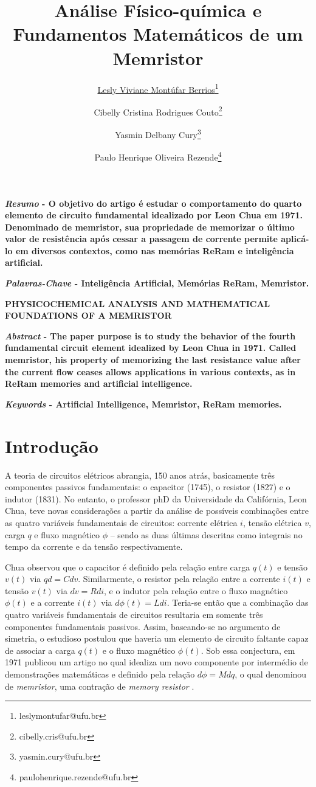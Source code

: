 \documentclass{ceel}
\title{Análise Físico-química e Fundamentos Matemáticos de um Memristor}
\author[1]{\underline{Lesly Viviane Montúfar Berrios}\thanks{leslymontufar@ufu.br}}
\author[1]{Cibelly Cristina Rodrigues Couto\thanks{cibelly.cris@ufu.br}}
\author[1]{Yasmin Delbany Cury\thanks{yasmin.cury@ufu.br}}
\author[2]{Paulo Henrique Oliveira Rezende\thanks{paulohenrique.rezende@ufu.br}}
\affil[1]{FEELT - Universidade Federal de Uberlândia}
\affil[2]{FEELT - Professor Adjunto - Universidade Federal de Uberlândia}
\begin{document}
\inserirtitulo

\begin{multicols}{2}

\textbf{\emph{Resumo} - O objetivo do artigo é estudar o comportamento do quarto elemento de circuito fundamental idealizado por Leon Chua em 1971. Denominado de memristor, sua propriedade de memorizar o último valor de resistência após cessar a passagem de corrente permite aplicá-lo em diversos contextos, como nas memórias ReRam e inteligência artificial.}
\vspace*{10pt}

\textbf{\emph{Palavras-Chave} - Inteligência Artificial, Memórias ReRam, Memristor.}


\begin{center}

\noindent\textbf{\large \uppercase{Physicochemical Analysis and Mathematical Foundations of a Memristor}}
\end{center}

\textbf{\emph{Abstract} - The paper purpose is to study the behavior of the fourth fundamental circuit element idealized by Leon Chua in 1971. Called memristor, his property of memorizing the last resistance value after the current flow ceases allows applications in various contexts, as in ReRam memories and artificial intelligence.}
\vspace*{10pt}

\textbf{\emph{Keywords} - Artificial Intelligence, Memristor, ReRam memories.}


\section{Introdução}
A teoria de circuitos elétricos abrangia, 150 anos atrás, basicamente três componentes passivos fundamentais: o capacitor (1745), o resistor (1827) e o indutor (1831). No entanto, o professor phD da Universidade da Califórnia, Leon Chua, teve novas considerações a partir da análise de possíveis combinações entre as quatro variáveis fundamentais de circuitos: corrente elétrica $i$, tensão elétrica $v$, carga $q$ e fluxo magnético $\phi$ – sendo as duas últimas descritas como integrais no tempo da corrente e da tensão respectivamente.

Chua observou que o capacitor é definido pela relação entre carga $q(t)$ e tensão $v(t)$ via $qd=C dv$. Similarmente, o resistor pela relação entre a corrente $i(t)$ e tensão $v(t)$ via $dv=R di$, e o indutor pela relação entre o fluxo magnético $\phi(t)$ e a corrente $i(t)$ via $d\phi(t)=L di$. Teria-se então que a combinação das quatro variáveis fundamentais de circuitos resultaria em somente três componentes fundamentais passivos. Assim, baseando-se no argumento de simetria, o estudioso postulou que haveria um elemento de circuito faltante capaz de associar a carga $q(t)$ e o fluxo magnético $\phi(t)$. Sob essa conjectura, em 1971 publicou um artigo no qual idealiza um novo componente por intermédio de demonstrações matemáticas e definido pela relação $d\phi=M dq$, o qual denominou de \emph{memristor}, uma contração de \emph{memory resistor} \cite{artigo}. 


\end{multicols}
\end{document}
